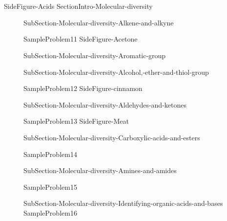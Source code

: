 \documentclass[main.tex]{subfiles}
\begin{document}
\section{\color{blue!30!black}{Molecular diversity}}
{SideFigure-Acids}
 {SectionIntro-Molecular-diversity}\sloppy
\begin{description}
\item[]{SubSection-Molecular-diversity-Alkene-and-alkyne}

{SampleProblem11}
 {SideFigure-Acetone}

 \item[]{SubSection-Molecular-diversity-Aromatic-group}
 \hspace{-2cm}{Table-Functional-groups}


\item[]{SubSection-Molecular-diversity-Alcohol,-ether-and-thiol-group}

{SampleProblem12}
{SideFigure-cinnamon}

\item[] {SubSection-Molecular-diversity-Aldehydes-and-ketones}

{SampleProblem13}
 {SideFigure-Meat}

\item[]{SubSection-Molecular-diversity-Carboxylic-acids-and-esters}

{SampleProblem14}

 \item[] {SubSection-Molecular-diversity-Amines-and-amides}

{SampleProblem15}
\item[]{SubSection-Molecular-diversity-Identifying-organic-acids-and-bases}
{SampleProblem16}

 \end{description}



\clearpage\thispagestyle{empty}\mbox{}\clearpage
\end{document}
